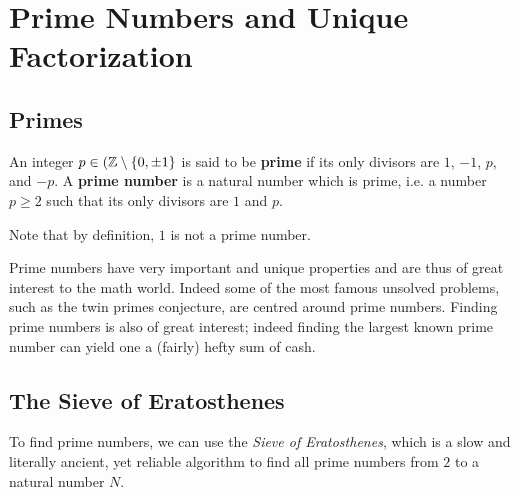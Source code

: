 \section{Prime Numbers and Unique Factorization}

\subsection{Primes}

\begin{defbox}
   An integer $p \in (\mathbb{Z} \setminus \{0, \pm 1\}$ is said to be \textbf{prime} if its only divisors are $1$, $-1$, $p$, and $-p$. A \textbf{prime number} is a natural number which is prime, i.e. a number $p \geq 2$ such that its only divisors are $1$ and $p$. 
\end{defbox}

Note that by definition, $1$ is not a prime number. 

Prime numbers have very important and unique properties and are thus of great interest to the math world. Indeed some of the most famous unsolved problems, such as the twin primes conjecture, are centred around prime numbers. Finding prime numbers is also of great interest; indeed finding the largest known prime number can yield one a (fairly) hefty sum of cash. 

\subsection{The Sieve of Eratosthenes}

To find prime numbers, we can use the \textit{Sieve of Eratosthenes}, which is a slow and literally ancient, yet reliable algorithm to find all prime numbers from $2$ to a natural number $N$.

